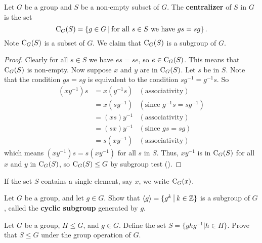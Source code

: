 \begin{example}\label{example-centralizer-of-a-subset}
    Let $G$ be a group and $S$ be a non-empty subset of $G$. The \textbf{centralizer} of $S$ in $G$ is the set
    \[
        \Centralizer{G}{S} = \left\{g \in G \vert \text{for all } s \in S \text{ we have } gs = sg\right\}.
    \]
    Note $\mathrm{C}_{G}(S)$ is a subset of $G$. We claim that $\mathrm{C}_{G}(S)$ is a subgroup of $G$.
    \begin{proof}
        Clearly for all $s \in S$ we have $es = se$, so $e \in \mathrm{C}_{G}(S)$. This means that $\mathrm{C}_{G}(S)$ is non-empty. Now suppose $x$ and $y$ are in $\mathrm{C}_{G}(S)$. Let $s$ be in $S$. Note that the condition $gs = sg$ is equivalent to the condition $sg^{-1} = g^{-1}s$. So
        \begin{align*}
            (xy^{-1})s &= x(y^{-1}s) & (\text{associativity})\\
            &= x(sy^{-1}) & (\text{since } g^{-1}s = sg^{-1})\\
            &= (xs)y^{-1} & (\text{associativity})\\
            &= (sx)y^{-1} & (\text{since } gs = sg)\\
            &= s(xy^{-1}) & (\text{associativity})
        \end{align*}
        which means $(xy^{-1})s = s(xy^{-1})$ for all $s$ in $S$. Thus, $xy^{-1}$ is in $\mathrm{C}_{G}(S)$ for all $x$ and $y$ in $\mathrm{C}_{G}(S)$, so $\mathrm{C}_{G}(S) \leq G$ by subgroup test ().
    \end{proof}
\end{example}
\begin{remark}
    If the set $S$ contains a single element, say $x$, we write $\mathrm{C}_{G}(x)$.
\end{remark}

\begin{exercise}
    Let $G$ be a group, and let $g \in G$. Show that $\langle g \rangle = \{g^k \vert k \in \Z\}$ is a subgroup of $G$, called the \textbf{cyclic subgroup} generated by $g$.
\end{exercise}

\begin{exercise}\label{exercise-conjugate-subgroup}
    Let $G$ be a group, $H \leq G$, and $g \in G$. Define the set $S = \{ghg^{-1} \vert h \in H\}$. Prove that $S \leq G$ under the group operation of $G$.
\end{exercise}


